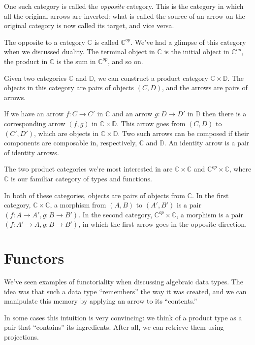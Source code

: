\documentclass[DaoFP]{subfiles}
\begin{document}
One such category is called the \emph{opposite} category. This is the category in which all the original arrows are inverted: what is called the source of an arrow on the original category is now called its target, and vice versa. 

The opposite to a category $\mathbb{C}$ is called $\mathbb{C}^{op}$. We've had a glimpse of this category when we discussed duality. The terminal object in  $\mathbb{C}$ is the initial object in $\mathbb{C}^{op}$, the product in  $\mathbb{C}$ is the sum in $\mathbb{C}^{op}$, and so on. 

Given two categories $\mathbb{C}$ and $\mathbb{D}$, we can construct a product category $\mathbb{C} \times \mathbb{D}$. The objects in this category are pairs of objects $(C, D)$, and the arrows are pairs of arrows. 

If we have an arrow $f \colon C \to C'$ in $\mathbb{C}$ and an arrow $g \colon D \to D'$ in $\mathbb{D}$ then there is a corresponding arrow $(f, g)$ in $\mathbb{C} \times \mathbb{D}$.  This arrow goes from $(C, D)$ to $(C', D')$, which are objects in $\mathbb{C} \times \mathbb{D}$. Two such arrows can be composed if their components are composable in, respectively, $\mathbb{C}$ and $\mathbb{D}$. An identity arrow is a pair of identity arrows.

The two product categories we're most interested in are $\mathbb{C} \times \mathbb{C}$ and $\mathbb{C}^{op} \times \mathbb{C}$, where $\mathbb{C}$ is our familiar category of types and functions.

In both of these categories, objects are pairs of objects from $\mathbb{C}$. In the first category, $\mathbb{C} \times \mathbb{C}$, a morphism from $(A, B)$ to $(A', B')$ is a pair $(f \colon A \to A', g \colon B \to B')$. In the second category, $\mathbb{C}^{op} \times \mathbb{C}$, a morphism is a pair $(f \colon A' \to A, g \colon B \to B')$, in which the first arrow goes in the opposite direction.

\section{Functors}

We've seen examples of functoriality when discussing algebraic data types. The idea was that such a data type 	``remembers'' the way it was created, and we can manipulate this memory by applying an arrow to its ``contents.'' 

In some cases this intuition is very convincing: we think of a product type as a pair that ``contains'' its ingredients. After all, we can retrieve them using projections. 
\end{document}
